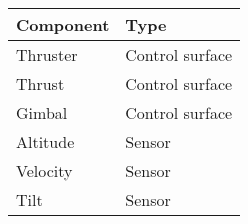 \documentclass{standalone}
\begin{document}
%

\begin{table}[htbp]
\centering
\begin{tabular}{ll}
\toprule
\textbf{Component}    & \textbf{Type}   \\
\midrule
Thruster              & Control surface \\
Thrust                & Control surface \\
Gimbal                & Control surface \\
Altitude              & Sensor          \\
Velocity              & Sensor          \\
Tilt                  & Sensor          \\
\bottomrule
\end{tabular}
\end{table}
\end{document}

